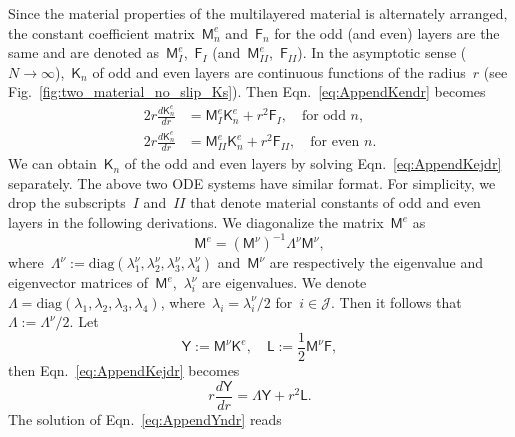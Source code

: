 \documentclass[preprint,10pt,times]{elsarticle}
\numberwithin{equation}{section}
\renewcommand{\u}[1]{\boldsymbol{#1}}
\newcommand{\usf}[1]{\u{\mathsf #1}}
\renewcommand{\>}{$\Rightarrow$}
\begin{document}
Since the material properties of the multilayered material is alternately arranged, the constant coefficient matrix~$\usf{M}_n^e$ and~$\usf{F}_n$ for the odd (and even) layers are the same and are denoted as~$\usf{M}_I^e$,~$\usf{F}_I$ (and~$\usf{M}_{II}^e$,~$\usf{F}_{II}$). In the asymptotic sense ($N \to \infty$),~$\usf{K}_n$ of odd and even layers are continuous functions of the radius~$r$ (see Fig.~\ref{fig:two_material_no_slip_Ks}). Then Eqn.~\eqref{eq:AppendKendr} becomes
\begin{subequations}
\begin{align}
	2 r \frac{d\usf{K}_n^e}{dr} & = \usf{M}_I^e \usf{K}_n^e + r^2 \usf{F}_I, \quad \text{for odd~$n$}, \\
	2 r \frac{d\usf{K}_n^e}{dr} & = \usf{M}_{II}^e \usf{K}_n^e + r^2 \usf{F}_{II}, \quad \text{for even~$n$}.
\end{align}
\label{eq:AppendKejdr}
\end{subequations}
We can obtain~$\usf{K}_n$ of the odd and even layers by solving Eqn.~\eqref{eq:AppendKejdr} separately. The above two ODE systems have similar format. For simplicity, we drop the subscripts~$I$ and~$II$ that denote material constants of odd and even layers in the following derivations. We diagonalize the matrix~$\usf{M}^e$ as
\begin{equation}
    \usf{M}^e = (\usf{M}^{\nu})^{-1} \usf{\Lambda}^{\nu} \usf{M}^{\nu},
\end{equation}
where~$\usf{\Lambda}^{\nu} := \text{diag}(\lambda^{\nu}_1,\lambda^{\nu}_2,\lambda^{\nu}_3,\lambda^{\nu}_4)$ and~$\usf{M}^{\nu}$ are respectively the eigenvalue and eigenvector matrices of~$\usf{M}^e$,~$\lambda^{\nu}_i$ are eigenvalues. We denote~$\usf{\Lambda}= \text{diag}(\lambda_1,\lambda_2,\lambda_3,\lambda_4)$, where~$\lambda_i = \lambda^{\nu}_i/2$ for~$i \in \mathcal{J}$. Then it follows that~$\usf{\Lambda} := \usf{\Lambda}^{\nu}/2$.  
Let
\begin{equation}
	\usf{Y} := \usf{M}^{\nu} \usf{K}^e, \quad \usf{L} := \frac{1}{2}\usf{M}^{\nu} \usf{F}, 
\end{equation}
then Eqn.~\eqref{eq:AppendKejdr} becomes
\begin{equation}
	r \frac{d\usf{Y}}{dr} = \usf{\Lambda} \usf{Y} + r^2 \usf{L}.
	\label{eq:AppendYndr}
\end{equation}
The solution of Eqn.~\eqref{eq:AppendYndr} reads
\end{document}

